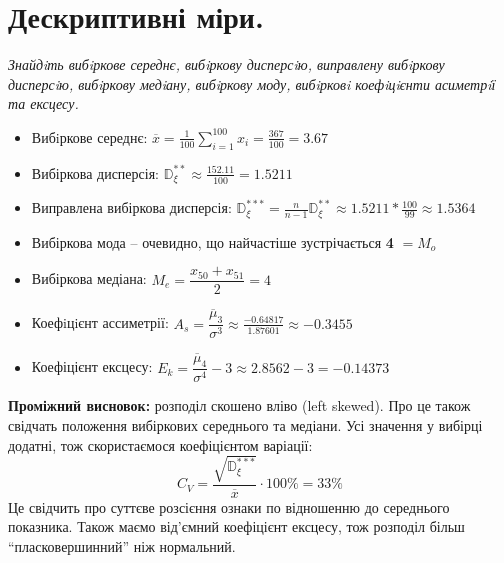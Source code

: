 \documentclass[14pt,a4paper]{scrartcl}
\theoremstyle{definition}
\theoremstyle{remark}
\theoremstyle{definition}
\theoremstyle{definition}
\begin{document}
\section{Дескриптивні міри.}
\textit{Знайдiть вибiркове середнє, вибiркову дисперсiю, виправлену вибiркову дисперсiю, вибiркову медiану, вибiркову моду, вибiрковi коефiцiєнти асиметрiї та ексцесу.}
\begin{itemize}
  \item Вибiркове середнє: \( \overline{x} = \frac{1}{100}  \sum\limits_{i = 1}^{100}{x_i} = \frac{367}{100} = 3.67 \)
  \item Вибіркова дисперсія: \( \mathbb{D}^{**}_\xi \approx \frac{152.11}{100} = 1.5211 \)
  \item Виправлена вибіркова дисперсія: \( \mathbb{D}^{***}_\xi = \frac{n}{n-1} \mathbb{D}^{**}_{\xi} \approx 1.5211 * \frac{100}{99} \approx 1.5364 \)
  \item Вибіркова мода -- очевидно, що найчастіше зустрічається \textbf{4} \( = M_o \)
  \item Вибіркова медіана: \( M_e = \dfrac{x_{50} + x_{51}}{2} = 4 \)
  \item Коефiцiєнт ассиметрії: \( A_s = \dfrac{\overline{\mu}_3}{\sigma^3} \approx \frac{-0.64817}{1.87601} \approx -0.3455 \)
  \item Коефіцієнт ексцесу: \( E_k = \dfrac{\overline{\mu}_4}{\sigma^4} - 3 \approx 2.8562 -3 = -0.14373 \)
  \end{itemize}
\textbf{Проміжний висновок:} розподіл скошено вліво (left skewed). Про це також свідчать положення вибіркових середнього та медіани. Усі значення у вибірці додатні, тож скористаємося коефіцієнтом варіації:
\[
 C_{V} =  \frac{\sqrt{\mathbb{D}_{\xi}^{***}}}{ \overline{x}} \cdot 100\% = 33\%
\]
Це свідчить про суттєве розсієння ознаки по відношенню до середнього показника. Також маємо від'ємний коефіцієнт ексцесу, тож розподіл більш ``пласковершинний'' ніж нормальний.
\newpage
\end{document}
